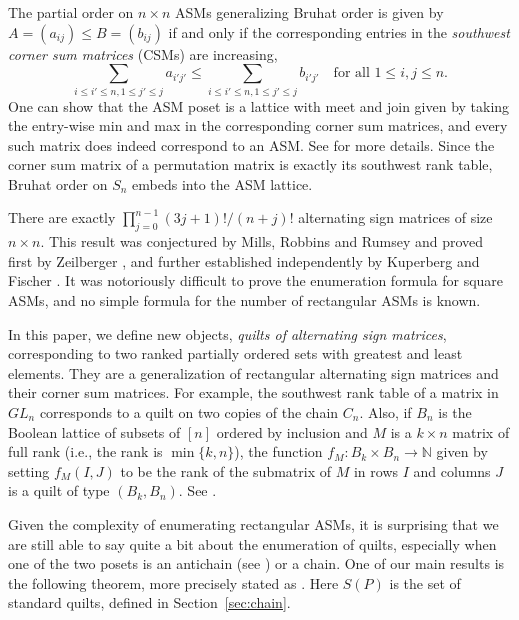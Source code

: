 \documentclass[12pt]{amsart}
\numberwithin{equation}{section}
\theoremstyle{definition}
\begin{document}
The partial order on $n \times n$ ASMs generalizing Bruhat order is
given by $A=(a_{ij})\leq B=(b_{ij})$ if and only if the corresponding
entries in the \textit{southwest corner sum matrices} (CSMs) are increasing,
\begin{equation}\label{eq:nw.sum.test}
\sum_{i\leq  i'\leq n, 1\leq j'\leq j}a_{i'j'} \leq \sum_{i\leq
i'\leq n, 1\leq j'\leq j}b_{i'j'} \quad \mbox{for all } 1 \leq i,j \leq n.
\end{equation}
One can show that the ASM poset is a lattice with meet and join given by
taking the entry-wise min and max in the corresponding corner sum
matrices, and every such  matrix does indeed correspond to an
ASM. See  for more details. Since the corner sum
matrix of a permutation matrix is exactly its southwest rank table, Bruhat order
on $S_{n}$ embeds into the ASM lattice.


There are exactly $\prod_{j=0}^{n-1}(3j+1)!/(n+j)! $ alternating sign
matrices of size $n \times n$.  This result was conjectured by Mills,
Robbins and Rumsey and proved first by Zeilberger
\cite{zeilberger-ASM}, and further established independently by
Kuperberg and Fischer \cite{kuperberg-ASM,Fischer.2005}.  It was
notoriously difficult to prove the enumeration formula for square
ASMs, and no simple formula for the number of rectangular ASMs is
known. 

In this paper, we define new objects, \emph{quilts of alternating sign
matrices}, corresponding to two ranked partially ordered sets with greatest and least elements. They are a
generalization of rectangular alternating sign matrices and their
corner sum matrices.  For example, the southwest rank table of a
matrix in $GL_{n}$ corresponds to a quilt on two copies of the chain
$C_{n}$.  Also, if $B_{n}$ is the Boolean lattice of subsets of $[n]$
ordered by inclusion and $M$ is a $k \times n$ matrix of full rank (i.e., the rank is $\min\{k,n\}$), the function
$f_{M}:B_{k} \times B_{n} \longrightarrow \mathbb{N}$ given by setting
$f_{M}(I,J)$ to be the rank of the submatrix of $M$ in rows $I$ and
columns $J$ is a quilt of type $(B_{k}, B_{n})$.  See
.


Given the complexity of enumerating rectangular ASMs, it is surprising
that we are still able to say quite a bit about the enumeration of
quilts, especially when one of the two posets is an antichain (see ) or a
chain. One of our main results is the following theorem, more precisely
stated as . Here $S(P)$ is the set of standard quilts,
defined in Section~\ref{sec:chain}.
\end{document}
